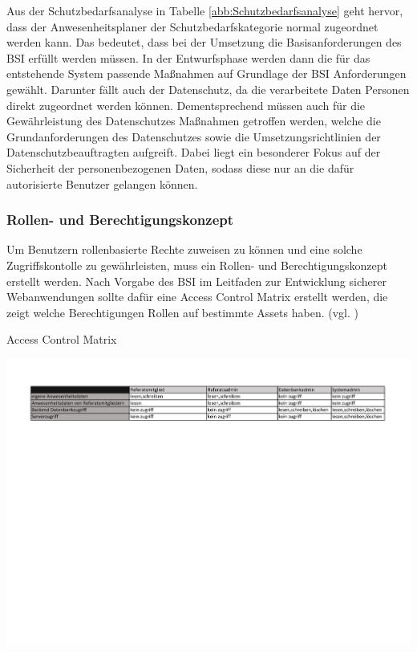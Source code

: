 Aus der Schutzbedarfsanalyse in Tabelle \ref{abb:Schutzbedarfsanalyse} geht hervor, dass der Anwesenheitsplaner der Schutzbedarfskategorie normal zugeordnet werden kann. Das bedeutet, dass bei der Umsetzung die Basisanforderungen des BSI erfüllt werden müssen. In der Entwurfsphase werden dann die für das entstehende System passende Maßnahmen auf Grundlage der BSI Anforderungen gewählt. Darunter fällt auch der Datenschutz, da die verarbeitete Daten Personen direkt zugeordnet werden können. Dementsprechend müssen auch für die Gewährleistung des Datenschutzes Maßnahmen getroffen werden, welche die Grundanforderungen des Datenschutzes sowie die Umsetzungsrichtlinien der Datenschutzbeauftragten aufgreift. Dabei liegt ein besonderer Fokus auf der Sicherheit der personenbezogenen Daten, sodass diese nur an die dafür autorisierte Benutzer gelangen können.

\subsubsection{Rollen- und Berechtigungskonzept}
\label{sec:RollenBerechtigungskonzept}
Um Benutzern rollenbasierte Rechte zuweisen zu können und eine solche Zugriffskontolle zu gewährleisten, muss ein Rollen- und Berechtigungskonzept erstellt werden. Nach Vorgabe des BSI im Leitfaden zur Entwicklung sicherer Webanwendungen sollte dafür eine Access Control Matrix erstellt werden, die zeigt welche Berechtigungen Rollen auf bestimmte Assets haben. (vgl. \cite[S.26]{BSIWeb})

\begin{table}[htbp]
    \centering
    \caption[Access Control Matrix]{Access Control Matrix}
    \includegraphics[width=1\textwidth,angle=0]{abb/Berechtigungsmatrix.pdf}
    \label{abb:AccessControlMatrix}
\end{table}

